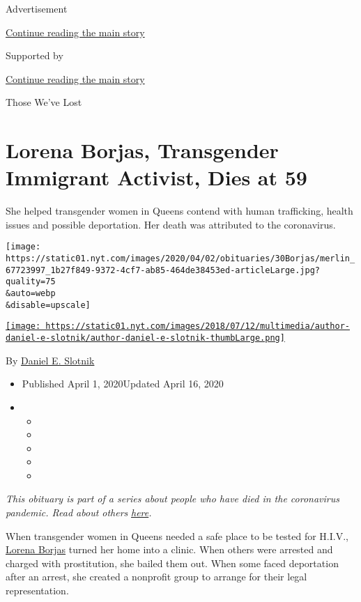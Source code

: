 Advertisement

\protect\hyperlink{after-top}{Continue reading the main story}

Supported by

\protect\hyperlink{after-sponsor}{Continue reading the main story}

Those We've Lost

\hypertarget{lorena-borjas-transgender-immigrant-activist-dies-at-59}{%
\section{Lorena Borjas, Transgender Immigrant Activist, Dies at
59}\label{lorena-borjas-transgender-immigrant-activist-dies-at-59}}

She helped transgender women in Queens contend with human trafficking,
health issues and possible deportation. Her death was attributed to the
coronavirus.

\texttt{[image: https://static01.nyt.com/images/2020/04/02/obituaries/30Borjas/merlin\_67723997\_1b27f849-9372-4cf7-ab85-464de38453ed-articleLarge.jpg?quality=75\\\&auto=webp\\\&disable=upscale]}

\href{https://www.nytimes.com/by/daniel-e-slotnik}{\texttt{[image: https://static01.nyt.com/images/2018/07/12/multimedia/author-daniel-e-slotnik/author-daniel-e-slotnik-thumbLarge.png]}}

By \href{https://www.nytimes.com/by/daniel-e-slotnik}{Daniel E. Slotnik}

\begin{itemize}
\item
  Published April 1, 2020Updated April 16, 2020
\item
  \begin{itemize}
  \item
  \item
  \item
  \item
  \item
  \end{itemize}
\end{itemize}

\emph{This obituary is part of a series about people who have died in
the coronavirus pandemic. Read about others}
\href{https://www.nytimes.com/series/people-who-have-died-of-the-coronavirus}{\emph{here}}\emph{.}

When transgender women in Queens needed a safe place to be tested for
H.I.V., \href{https://www.facebook.com/lbcfny/}{Lorena Borjas} turned
her home into a clinic. When others were arrested and charged with
prostitution, she bailed them out. When some faced deportation after an
arrest, she created a nonprofit group to arrange for their legal
representation.

